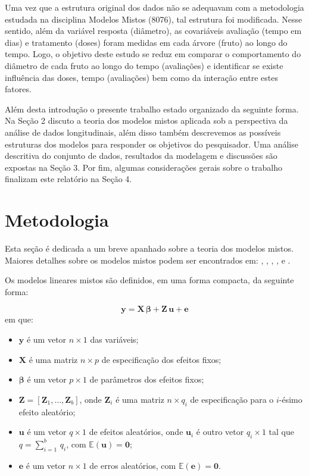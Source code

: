 \documentclass[12pt,a4paper,final]{article}
\begin{document}
Uma vez que a estrutura original dos dados não se adequavam com a metodologia estudada na disciplina
Modelos Mistos (8076), tal estrutura foi modificada. Nesse sentido, além da variável resposta (diâmetro), 
as covariáveis avaliação (tempo em dias) e tratamento (doses) foram medidas em cada árvore (fruto) ao longo do tempo.
Logo, o objetivo deste estudo se reduz em comparar o comportamento do diâmetro de cada fruto ao longo do tempo (avaliações)
e identificar se existe influência das doses, tempo (avaliações) bem como da interação entre estes fatores. 

Além desta introdução o presente trabalho estado organizado da seguinte forma. 
Na Seção 2 discuto a teoria dos modelos mistos aplicada sob a perspectiva da análise 
de dados longitudinais, além disso também descrevemos as possíveis estruturas dos modelos 
para responder os objetivos do pesquisador. Uma análise descritiva do conjunto de dados, resultados 
da modelagem e discussões são expostas na Seção 3. Por fim, algumas considerações gerais sobre o trabalho 
finalizam este relatório na Seção 4.

\newpage
\section{Metodologia}
Esta seção é dedicada a um breve apanhado sobre a teoria dos modelos mistos. Maiores detalhes sobre os modelos
mistos podem ser encontrados em: 
,
, 
, 
,
 e 
.


Os modelos lineares mistos são definidos, em uma forma compacta, da seguinte forma:

\begin{equation}\label{eq:definicao}
\mathbf{y} = \mathbf{X}\,\bm{\beta} + \mathbf{Z}\,\mathbf{u} + \mathbf{e}
\end{equation}
em que:
\begin{itemize}
	\item $\mathbf{y}$ é um vetor $ n \times 1 $ das variáveis;
	\item $\mathbf{X}$ é uma matriz $ n \times p $ de especificação dos efeitos fixos;
	\item $\bm{\beta}$ é um vetor $ p \times 1 $ de parâmetros dos efeitos fixos;
	\item $\mathbf{Z} = \left[\mathbf{Z}_1, \ldots, \mathbf{Z}_b\right]$, onde $ \mathbf{Z}_i $ é uma matriz
	$ n \times q_i $ de especificação para o $i$-ésimo efeito aleatório;
	\item $\mathbf{u}$ é um vetor $ q \times 1$ de efeitos aleatórios, onde $ \mathbf{u}_i $ é outro vetor
	$ q_i \times 1 $ tal que $q = \sum\limits_{i=1}^{b}\,q_i$, com $\mathbb{E}(\mathbf{u}) = \bm{0}$;
	\item $\mathbf{e}$ é um vetor $ n \times 1$ de erros aleatórios, com $\mathbb{E}(\mathbf{e}) = \bm{0}$.
\end{itemize}
\end{document}
